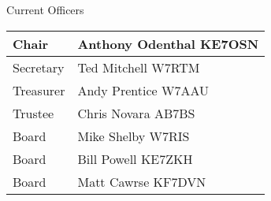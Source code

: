 	Current Officers \\
	\begin{tabular}{|l|l|} \hline
		Chair & Anthony Odenthal KE7OSN \\ \hline
		Secretary & Ted Mitchell W7RTM \\ \hline
		Treasurer & Andy Prentice W7AAU \\ \hline
		Trustee & Chris Novara AB7BS \\ \hline
		Board & Mike Shelby W7RIS \\ \hline
		Board & Bill Powell KE7ZKH \\ \hline
		Board & Matt Cawrse KF7DVN \\ \hline
	\end{tabular}
	
	\subsection*{}

